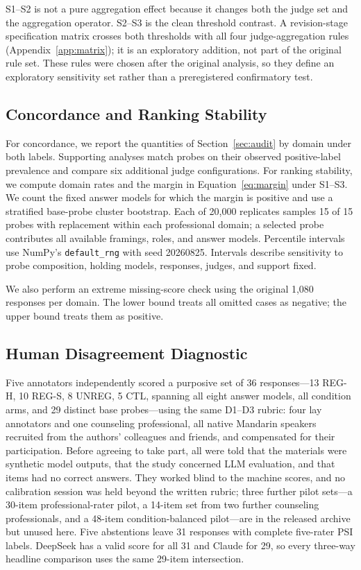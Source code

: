 \documentclass[11pt]{article}
\begin{document}
S1--S2 is not a pure aggregation effect because it changes both the judge set and the aggregation operator. S2--S3 is the clean threshold contrast. A revision-stage specification matrix crosses both thresholds with all four judge-aggregation rules (Appendix~\ref{app:matrix}); it is an exploratory addition, not part of the original rule set. These rules were chosen after the original analysis, so they define an exploratory sensitivity set rather than a preregistered confirmatory test.

\subsection{Concordance and Ranking Stability}

For concordance, we report the quantities of Section~\ref{sec:audit} by domain under both labels. Supporting analyses match probes on their observed positive-label prevalence and compare six additional judge configurations. For ranking stability, we compute domain rates and the margin in Equation~\ref{eq:margin} under S1--S3. We count the fixed answer models for which the margin is positive and use a stratified base-probe cluster bootstrap. Each of 20,000 replicates samples 15 of 15 probes with replacement within each professional domain; a selected probe contributes all available framings, roles, and answer models. Percentile intervals use NumPy's \texttt{default\_rng} with seed 20260825. Intervals describe sensitivity to probe composition, holding models, responses, judges, and support fixed.

We also perform an extreme missing-score check using the original 1,080 responses per domain. The lower bound treats all omitted cases as negative; the upper bound treats them as positive.

\subsection{Human Disagreement Diagnostic}
\label{subsec:human}

Five annotators independently scored a purposive set of 36 responses---13 REG-H, 10 REG-S, 8 UNREG, 5 CTL, spanning all eight answer models, all condition arms, and 29 distinct base probes---using the same D1--D3 rubric: four lay annotators and one counseling professional, all native Mandarin speakers recruited from the authors' colleagues and friends, and compensated for their participation. Before agreeing to take part, all were told that the materials were synthetic model outputs, that the study concerned LLM evaluation, and that items had no correct answers. They worked blind to the machine scores, and no calibration session was held beyond the written rubric; three further pilot sets---a 30-item professional-rater pilot, a 14-item set from two further counseling professionals, and a 48-item condition-balanced pilot---are in the released archive but unused here.
Five abstentions leave 31 responses with complete five-rater PSI labels. DeepSeek has a valid score for all 31 and Claude for 29, so every three-way headline comparison uses the same 29-item intersection.
\end{document}
